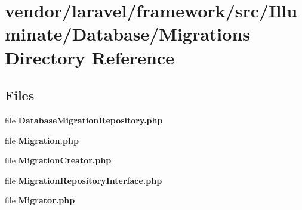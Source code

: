 \section{vendor/laravel/framework/src/\+Illuminate/\+Database/\+Migrations Directory Reference}
\label{dir_878f67454ad3464e4f95508e60132b14}
\subsection*{Files}
\begin{DoxyCompactItemize}
\item 
file {\bf Database\+Migration\+Repository.\+php}
\item 
file {\bf Migration.\+php}
\item 
file {\bf Migration\+Creator.\+php}
\item 
file {\bf Migration\+Repository\+Interface.\+php}
\item 
file {\bf Migrator.\+php}
\end{DoxyCompactItemize}
